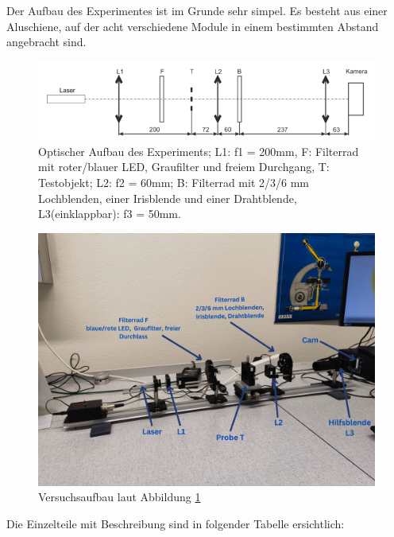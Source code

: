 \documentclass[12pt,a4paper,twoside]{article}
\begin{document}
Der Aufbau des Experimentes ist im Grunde sehr simpel. Es besteht aus einer Aluschiene, auf der acht verschiedene Module in einem bestimmten Abstand angebracht sind. 

\begin{figure}[H]
    \centering
    \includegraphics[width=0.8\linewidth]{nudes/VersuchsaufbauTheoretisch.png}
    \caption{Optischer Aufbau des Experiments; L1: f1 = 200mm, F: Filterrad mit roter/blauer LED, Graufilter und freiem
    Durchgang, T: Testobjekt; L2: f2 = 60mm; B: Filterrad mit 2/3/6 mm Lochblenden, einer Irisblende und einer
    Drahtblende, L3(einklappbar): f3 = 50mm. \cite{teachcenter2}}
    \label{fig:VersuchsaufbauTheoretisch}
\end{figure}

\begin{figure}[H]
    \centering
    \includegraphics[width=0.7\linewidth]{nudes/VersuchsaufbauIRLbeschriftet.jpg}
    \caption{Versuchsaufbau laut Abbildung \ref{fig:VersuchsaufbauTheoretisch}}
    \label{fig:Versuchsaufbau}
\end{figure}

Die Einzelteile mit Beschreibung sind in folgender Tabelle ersichtlich:
\end{document}

